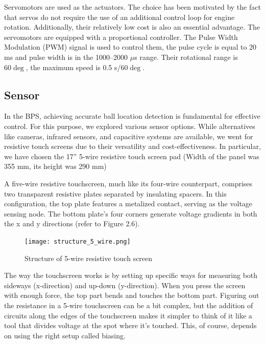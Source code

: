 Servomotors are used as the actuators. The choice has been motivated by the fact that servos do not require the use of an additional control loop for engine rotation. Additionally, their relatively low cost is also an essential advantage. The servomotors are equipped with a proportional controller. The Pulse Width Modulation (PWM) signal is used to control them, the pulse cycle is equal to 20 ms and pulse width is in the 1000–2000 \(\mu\)s range. Their rotational range is \(60\deg\), the maximum speed is 0.5 s/\(60\deg\).
\subsection{Sensor}
In the BPS, achieving accurate ball location detection is fundamental for effective control. For this purpose, we explored various sensor options. While alternatives like cameras, infrared sensors, and capacitive systems are available, we went for resistive touch screens due to their versatility and cost-effectiveness. In particular, we have chosen the 17'' 5-wire resistive touch screen pad (Width of the panel was 355 mm, its height was 290 mm)

A five-wire resistive touchscreen, much like its four-wire counterpart, comprises two transparent resistive plates separated by insulating spacers. In this configuration, the top plate features a metalized contact, serving as the voltage sensing node. The bottom plate's four corners generate voltage gradients in both the x and y directions (refer to Figure 2.6).
\begin{figure}[h]
    \centering
    \texttt{[image: structure\_5\_wire.png]}
    \caption{Structure of 5-wire resistive touch screen}
    \label{fig:enter-label}
\end{figure}
The way the touchscreen works is by setting up specific ways for measuring both sideways (x-direction) and up-down (y-direction). When you press the screen with enough force, the top part bends and touches the bottom part. Figuring out the resistance in a 5-wire touchscreen can be a bit complex, but the addition of circuits along the edges of the touchscreen makes it simpler to think of it like a tool that divides voltage at the spot where it's touched. This, of course, depends on using the right setup called biasing.

